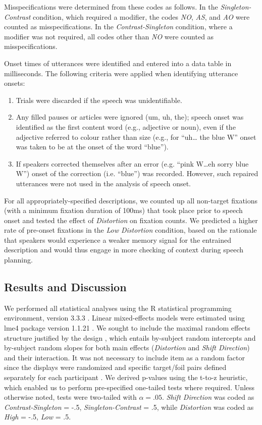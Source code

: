 \documentclass[natbib,doc,a4paper]{apa6}
\begin{document}
Misspecifications were determined from these codes as follows. In the \emph{Singleton-Contrast} condition, which required a modifier, the codes \emph{NO}, \emph{AS}, and \emph{AO} were counted as misspecifications. In the \emph{Contrast-Singleton} condition, where a modifier was not required, all codes other than \emph{NO} were counted as misspecifications.

Onset times of utterances were identified and entered into a data table in milliseconds.  The following criteria were applied when identifying utterance onsets:

\begin{enumerate}
\item Trials were discarded if the speech was unidentifiable.
\item Any filled pauses or articles were ignored (um, uh, the); speech
onset was identified as the first content word (e.g., adjective or
noun), even if the adjective referred to colour rather than size
(e.g., for ``uh\ldots{} the blue W'' onset was taken to be at the onset
of the word ``blue'').
\item If speakers corrected themselves after an error (e.g. ``pink W\ldots{}eh
sorry blue W'') onset of the correction (i.e. ``blue'') was
recorded. However, such repaired utterances were not used in the
analysis of speech onset.
\end{enumerate}

For all appropriately-specified descriptions, we counted up all non-target fixations (with a minimum fixation duration of 100ms) that took place prior to speech onset and tested the effect of \emph{Distortion} on fixation counts. We predicted a higher rate of pre-onset fixations in the \emph{Low Distortion} condition, based on the rationale that speakers would experience a weaker memory signal for the entrained description and would thus engage in more checking of context during speech planning.

\subsection*{Results and Discussion}
\label{sec:org8c4f671}
We performed all statistical analyses using the R statistical programming environment, version 3.3.3 \citep{R}. Linear mixed-effects models were estimated using lme4 package version 1.1.21 \citep{lme4}. We sought to include the maximal random effects structure justified by the design \citep{BarrEtAl2013}, which entails by-subject random intercepts and by-subject random slopes for both main effects (\emph{Distortion} and \emph{Shift Direction}) and their interaction. It was not necessary to include item as a random factor since the displays were randomized and specific target/foil pairs defined separately for each participant \citep{clark73}. We derived p-values using the t-to-z heuristic, which enabled us to perform pre-specified one-tailed tests where required. Unless otherwise noted, tests were two-tailed with \(\alpha = .05\).  \emph{Shift Direction} was coded as \emph{Contrast-Singleton} = -.5, \emph{Singleton-Contrast} = .5, while \emph{Distortion} was coded as \emph{High} = -.5, \emph{Low} = .5.
\end{document}
